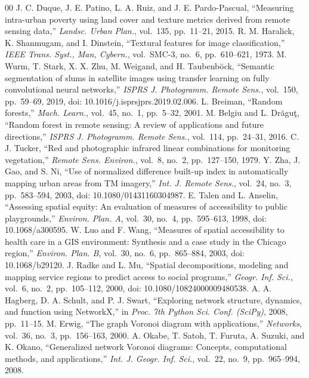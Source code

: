 \documentclass[conference]{IEEEtran}
\begin{document}
\begin{thebibliography}{00}
 J. C. Duque, J. E. Patino, L. A. Ruiz, and J. E. Pardo-Pascual, ``Measuring intra-urban poverty using land cover and texture metrics derived from remote sensing data,'' \textit{Landsc. Urban Plan.}, vol.~135, pp.~11--21, 2015.
 R. M. Haralick, K. Shanmugam, and I. Dinstein, ``Textural features for image classification,'' \textit{IEEE Trans. Syst., Man, Cybern.}, vol.~SMC-3, no.~6, pp.~610--621, 1973.
 M. Wurm, T. Stark, X. X. Zhu, M. Weigand, and H. Taubenb\"{o}ck, ``Semantic segmentation of slums in satellite images using transfer learning on fully convolutional neural networks,'' \textit{ISPRS J. Photogramm. Remote Sens.}, vol.~150, pp.~59--69, 2019, doi: 10.1016/j.isprsjprs.2019.02.006.
 L. Breiman, ``Random forests,'' \textit{Mach. Learn.}, vol.~45, no.~1, pp.~5--32, 2001.
 M. Belgiu and L. Dr\u{a}gu\c{t}, ``Random forest in remote sensing: A review of applications and future directions,'' \textit{ISPRS J. Photogramm. Remote Sens.}, vol.~114, pp.~24--31, 2016.
 C. J. Tucker, ``Red and photographic infrared linear combinations for monitoring vegetation,'' \textit{Remote Sens. Environ.}, vol.~8, no.~2, pp.~127--150, 1979.
 Y. Zha, J. Gao, and S. Ni, ``Use of normalized difference built-up index in automatically mapping urban areas from TM imagery,'' \textit{Int. J. Remote Sens.}, vol.~24, no.~3, pp.~583--594, 2003, doi: 10.1080/01431160304987.
 E. Talen and L. Anselin, ``Assessing spatial equity: An evaluation of measures of accessibility to public playgrounds,'' \textit{Environ. Plan. A}, vol.~30, no.~4, pp.~595--613, 1998, doi: 10.1068/a300595.
 W. Luo and F. Wang, ``Measures of spatial accessibility to health care in a GIS environment: Synthesis and a case study in the Chicago region,'' \textit{Environ. Plan. B}, vol.~30, no.~6, pp.~865--884, 2003, doi: 10.1068/b29120.
 J. Radke and L. Mu, ``Spatial decompositions, modeling and mapping service regions to predict access to social programs,'' \textit{Geogr. Inf. Sci.}, vol.~6, no.~2, pp.~105--112, 2000, doi: 10.1080/10824000009480538.
 A. A. Hagberg, D. A. Schult, and P. J. Swart, ``Exploring network structure, dynamics, and function using NetworkX,'' in \textit{Proc. 7th Python Sci. Conf. (SciPy)}, 2008, pp.~11--15.
 M. Erwig, ``The graph Voronoi diagram with applications,'' \textit{Networks}, vol.~36, no.~3, pp.~156--163, 2000.
 A. Okabe, T. Satoh, T. Furuta, A. Suzuki, and K. Okano, ``Generalized network Voronoi diagrams: Concepts, computational methods, and applications,'' \textit{Int. J. Geogr. Inf. Sci.}, vol.~22, no.~9, pp.~965--994, 2008.

\end{thebibliography}
\end{document}
